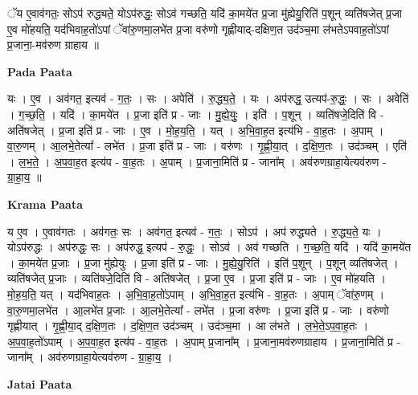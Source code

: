 \documentclass[17pt]{extarticle}
\begin{document}
ॅय ए॒वाव॑गतः॒ सोऽप॑ रुद्ध्यते॒ योऽप॑रुद्धः॒ सोऽव॑ गच्छति॒ यदि॑ का॒मये॑त प्र॒जा मु॑ह्येयु॒रिति॑ प॒शून् व्यति॑षजेत् प्र॒जा ए॒व मो॑हयति॒ यद॑भिवाह॒तो॑ऽपां ॅवा॑रु॒णमा॒लभे॑त प्र॒जा वरु॑णो गृह्णीयाद्-दक्षिण॒त उद॑ञ्च॒मा ल॑भतेऽपवाह॒तो॑ऽपां प्र॒जाना॒-मव॑रुण ग्राहाय ॥ \newline

\textbf{Pada Paata} \newline

यः । ए॒व । अव॑गत॒ इत्यव॑ - ग॒तः॒ । सः । अपेति॑ । रु॒द्ध्य॒ते॒ । यः । अप॑रुद्ध॒ उत्यप॑-रु॒द्धः॒ । सः । अवेति॑ । ग॒च्छ॒ति॒ । यदि॑ । का॒मये॑त । प्र॒जा इति॑ प्र - जाः । मु॒ह्ये॒युः॒ । इति॑ । प॒शून् । व्यति॑षजे॒दिति॑ वि - अति॑षजेत् । प्र॒जा इति॑ प्र - जाः । ए॒व । मो॒ह॒य॒ति॒ । यत् । अ॒भि॒वा॒ह॒त इत्य॑भि - वा॒ह॒तः । अ॒पाम् । वा॒रु॒णम् । आ॒लभे॒तेत्या᳚ - लभे॑त । प्र॒जा इति॑ प्र - जाः । वरु॑णः । गृ॒ह्णी॒या॒त् । द॒क्षि॒ण॒तः । उद॑ञ्चम् । एति॑ । ल॒भ॒ते॒ । अ॒प॒वा॒ह॒त इत्य॑प - वा॒ह॒तः । अ॒पाम् । प्र॒जाना॒मिति॑ प्र - जाना᳚म् । अव॑रुणग्राहा॒येत्यव॑रुण - ग्रा॒हा॒य॒ ॥  \newline


\textbf{Krama Paata} \newline

य ए॒व । ए॒वाव॑गतः । अव॑गतः॒ सः । अव॑गत॒ इत्यव॑ - ग॒तः॒ । सोऽप॑ । अप॑ रुद्ध्यते । रु॒द्ध्य॒ते॒ यः । योऽप॑रुद्धः । अप॑रुद्धः॒ सः । अप॑रुद्ध॒ इत्यप॑ - रु॒द्धः॒ । सोऽव॑ । अव॑ गच्छति । ग॒च्छ॒ति॒ यदि॑ । यदि॑ का॒मये॑त । का॒मये॑त प्र॒जाः । प्र॒जा मु॑ह्येयुः । प्र॒जा इति॑ प्र - जाः । मु॒ह्ये॒यु॒रिति॑ । इति॑ प॒शून् । प॒शून् व्यति॑षजेत् । व्यति॑षजेत् प्र॒जाः । व्यति॑षजे॒दिति॑ वि - अति॑षजेत् । प्र॒जा ए॒व । प्र॒जा इति॑ प्र - जाः । ए॒व मो॑हयति । मो॒ह॒य॒ति॒ यत् । यद॑भिवाह॒तः । अ॒भि॒वा॒ह॒तो॑ऽपाम् । अ॒भि॒वा॒ह॒त इत्य॑भि - वा॒ह॒तः । अ॒पाम् ॅवा॑रु॒णम् । वा॒रु॒णमा॒लभे॑त । आ॒लभे॑त प्र॒जाः । आ॒लभे॒तेत्या᳚ - लभे॑त । प्र॒जा वरु॑णः । प्र॒जा इति॑ प्र - जाः । वरु॑णो गृह्णीयात् । गृ॒ह्णी॒या॒द् द॒क्षि॒ण॒तः । द॒क्षि॒ण॒त उद॑ञ्चम् । उद॑ञ्च॒मा । आ ल॑भते । ल॒भे॒ते॒ऽप॒वा॒ह॒तः । अ॒प॒वा॒ह॒तो॑ऽपाम् । अ॒प॒वा॒ह॒त इत्य॑प - वा॒ह॒तः । अ॒पाम् प्र॒जाना᳚म् । प्र॒जाना॒मव॑रुणग्राहाय । प्र॒जाना॒मिति॑ प्र - जाना᳚म् । अव॑रुणग्राहा॒येत्यव॑रुण - ग्रा॒हा॒य॒ । \newline

\textbf{Jatai Paata} \newline
\end{document}
